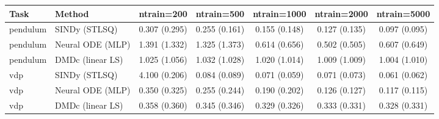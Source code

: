 \begin{tabular}{llccccc}\toprule
Task & Method & ntrain=200 & ntrain=500 & ntrain=1000 & ntrain=2000 & ntrain=5000 \\\midrule
pendulum & SINDy (STLSQ) & 0.307 (0.295) & 0.255 (0.161) & 0.155 (0.148) & 0.127 (0.135) & 0.097 (0.095) \\
pendulum & Neural ODE (MLP) & 1.391 (1.332) & 1.325 (1.373) & 0.614 (0.656) & 0.502 (0.505) & 0.607 (0.649) \\
pendulum & DMDc (linear LS) & 1.025 (1.056) & 1.032 (1.028) & 1.020 (1.014) & 1.009 (1.009) & 1.004 (1.010) \\
vdp & SINDy (STLSQ) & 4.100 (0.206) & 0.084 (0.089) & 0.071 (0.059) & 0.071 (0.073) & 0.061 (0.062) \\
vdp & Neural ODE (MLP) & 0.350 (0.325) & 0.255 (0.244) & 0.190 (0.202) & 0.126 (0.127) & 0.117 (0.115) \\
vdp & DMDc (linear LS) & 0.358 (0.360) & 0.345 (0.346) & 0.329 (0.326) & 0.333 (0.331) & 0.328 (0.331) \\
\bottomrule\end{tabular}
